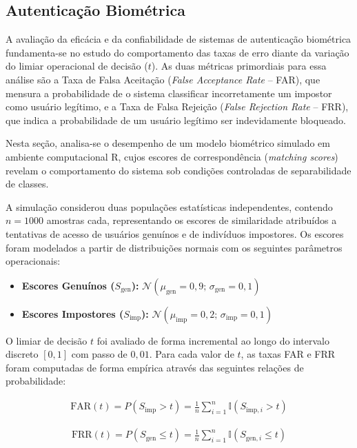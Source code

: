 \subsection{Autenticação Biométrica}
\label{subsec:analise_biometrica}

A avaliação da eficácia e da confiabilidade de sistemas de autenticação biométrica fundamenta-se no estudo do comportamento das taxas de erro diante da variação do limiar operacional de decisão ($t$). As duas métricas primordiais para essa análise são a Taxa de Falsa Aceitação (\textit{False Acceptance Rate} -- FAR), que mensura a probabilidade de o sistema classificar incorretamente um impostor como usuário legítimo, e a Taxa de Falsa Rejeição (\textit{False Rejection Rate} -- FRR), que indica a probabilidade de um usuário legítimo ser indevidamente bloqueado.

Nesta seção, analisa-se o desempenho de um modelo biométrico simulado em ambiente computacional R, cujos escores de correspondência (\textit{matching scores}) revelam o comportamento do sistema sob condições controladas de separabilidade de classes.


A simulação considerou duas populações estatísticas independentes, contendo $n = 1000$ amostras cada, representando os escores de similaridade atribuídos a tentativas de acesso de usuários genuínos e de indivíduos impostores. Os escores foram modelados a partir de distribuições normais com os seguintes parâmetros operacionais:

\begin{itemize}
	\item \textbf{Escores Genuínos ($S_{\text{gen}}$):} $\mathcal{N}(\mu_{\text{gen}} = 0{,}9; \,\sigma_{\text{gen}} = 0{,}1)$
	\item \textbf{Escores Impostores ($S_{\text{imp}}$):} $\mathcal{N}(\mu_{\text{imp}} = 0{,}2; \,\sigma_{\text{imp}} = 0{,}1)$
\end{itemize}

O limiar de decisão $t$ foi avaliado de forma incremental ao longo do intervalo discreto $[0, 1]$ com passo de $0{,}01$. Para cada valor de $t$, as taxas FAR e FRR foram computadas de forma empírica através das seguintes relações de probabilidade:

\begin{align*}
	\text{FAR}(t) = P(S_{\text{imp}} > t) = \frac{1}{n}\sum_{i=1}^{n} \mathbb{I}(S_{\text{imp}, i} > t)
\end{align*}

\begin{align*}
	\text{FRR}(t) = P(S_{\text{gen}} \le t) = \frac{1}{n}\sum_{i=1}^{n} \mathbb{I}(S_{\text{gen}, i} \le t)
\end{align*}

